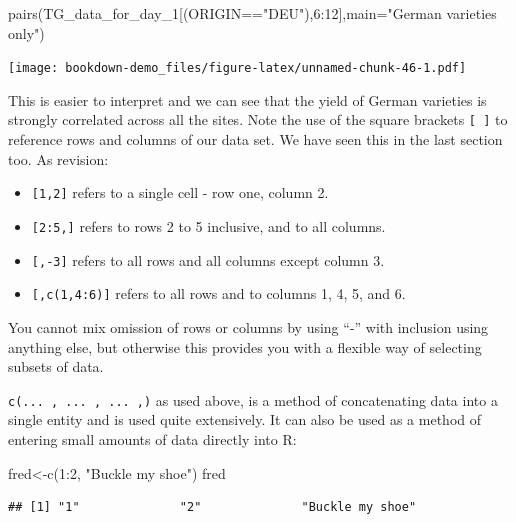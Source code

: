 \documentclass[
]{book}
\newenvironment{Shaded}{\begin{snugshade}}{\end{snugshade}}
\newcommand{\AttributeTok}[1]{\textcolor[rgb]{0.77,0.63,0.00}{#1}}
\newcommand{\DecValTok}[1]{\textcolor[rgb]{0.00,0.00,0.81}{#1}}
\newcommand{\FunctionTok}[1]{\textcolor[rgb]{0.00,0.00,0.00}{#1}}
\newcommand{\NormalTok}[1]{#1}
\newcommand{\OtherTok}[1]{\textcolor[rgb]{0.56,0.35,0.01}{#1}}
\newcommand{\SpecialCharTok}[1]{\textcolor[rgb]{0.00,0.00,0.00}{#1}}
\newcommand{\StringTok}[1]{\textcolor[rgb]{0.31,0.60,0.02}{#1}}
\providecommand{\tightlist}{%
  \setlength{\itemsep}{0pt}\setlength{\parskip}{0pt}}
\begin{document}
\begin{Shaded}
\begin{Highlighting}[]
\FunctionTok{pairs}\NormalTok{(TG\_data\_for\_day\_1[(ORIGIN}\SpecialCharTok{==}\StringTok{"DEU"}\NormalTok{),}\DecValTok{6}\SpecialCharTok{:}\DecValTok{12}\NormalTok{],}\AttributeTok{main=}\StringTok{"German varieties only"}\NormalTok{)}
\end{Highlighting}
\end{Shaded}

\texttt{[image: bookdown-demo\_files/figure-latex/unnamed-chunk-46-1.pdf]}

This is easier to interpret and we can see that the yield of German varieties is strongly correlated across all the sites. Note the use of the square brackets \texttt{{[}\ {]}} to reference rows and columns of our data set. We have seen this in the last section too. As revision:

\begin{itemize}
\tightlist
\item
  \texttt{{[}1,2{]}} refers to a single cell - row one, column 2.
\item
  \texttt{{[}2:5,{]}} refers to rows 2 to 5 inclusive, and to all columns.
\item
  \texttt{{[},-3{]}} refers to all rows and all columns except column 3.
\item
  \texttt{{[},c(1,4:6){]}} refers to all rows and to columns 1, 4, 5, and 6.
\end{itemize}

You cannot mix omission of rows or columns by using ``-'' with inclusion using anything else, but otherwise this provides you with a flexible way of selecting subsets of data.

\texttt{c(...\ ,\ ...\ ,\ ...\ ,)} as used above, is a method of concatenating data into a single entity and is used quite extensively. It can also be used as a method of entering small amounts of data directly into R:

\begin{Shaded}
\begin{Highlighting}[]
\NormalTok{fred}\OtherTok{\textless{}{-}}\FunctionTok{c}\NormalTok{(}\DecValTok{1}\SpecialCharTok{:}\DecValTok{2}\NormalTok{, }\StringTok{"Buckle my shoe"}\NormalTok{)}
\NormalTok{fred}
\end{Highlighting}
\end{Shaded}

\begin{verbatim}
## [1] "1"              "2"              "Buckle my shoe"
\end{verbatim}
\end{document}
